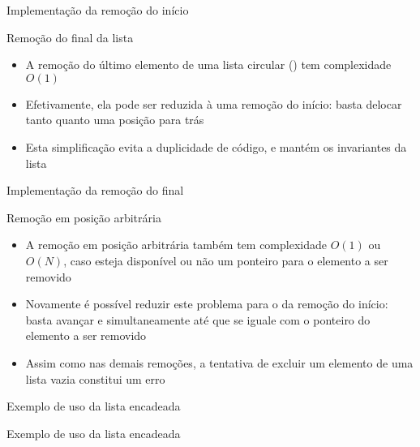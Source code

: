 \begin{frame}[fragile]{Implementação da remoção do início}
\end{frame}

\begin{frame}[fragile]{Remoção do final da lista}

    \begin{itemize}
        \item A remoção do último elemento de uma lista
            circular () tem complexidade $O(1)$

        \item Efetivamente, ela pode ser reduzida à uma remoção do início: basta delocar tanto
             quanto  uma posição para trás

        \item Esta simplificação evita a duplicidade de código, e mantém os invariantes da lista
    \end{itemize}

\end{frame}

\begin{frame}[fragile]{Implementação da remoção do final}
\end{frame}

\begin{frame}[fragile]{Remoção em posição arbitrária}

    \begin{itemize}
        \item A remoção em posição arbitrária também tem complexidade $O(1)$ ou $O(N)$, 
            caso esteja disponível ou não um ponteiro para o elemento a ser removido

        \item Novamente é possível reduzir este problema para o da remoção do início: basta
            avançar  e  simultaneamente até que  se
            iguale com o ponteiro do elemento a ser removido

        \item Assim como nas demais remoções, a tentativa de excluir um elemento de uma lista
            vazia constitui um erro
    \end{itemize}

\end{frame}

\begin{frame}[fragile]{Exemplo de uso da lista encadeada}
\end{frame}

\begin{frame}[fragile]{Exemplo de uso da lista encadeada}
\end{frame}
